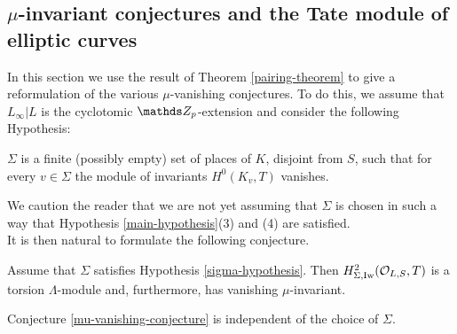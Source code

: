\documentclass[a4paper, 
headsepline=off, DIV=12, titlepage=false]{scrartcl}
\begin{document}
\subsection{$\mu$-invariant conjectures and the Tate module of elliptic curves}\label{mu-section}

In this section we use the result of Theorem \ref{pairing-theorem} to give a reformulation of the various $\mu$-vanishing conjectures. To do this, we assume that $L_\infty | L$ is the cyclotomic $\ZZ_p$-extension and consider the following Hypothesis:
\begin{hypothesis}\label{sigma-hypothesis}
    $\Sigma$ is a finite (possibly empty) set of places of $K$, disjoint from $S$, such that for every $v \in \Sigma$ the module of invariants $H^0(K_v, T)$ vanishes.
\end{hypothesis}
We caution the reader that we are not yet assuming that $\Sigma$ is chosen in such a way that Hypothesis \ref{main-hypothesis}(3) and (4) are satisfied.\\

It is then natural to formulate the following conjecture.

\begin{conjecture}\label{mu-vanishing-conjecture}
    Assume that $\Sigma$ satisfies Hypothesis \ref{sigma-hypothesis}. Then $H^2_{\Sigma, \mathrm{Iw}}(\mathcal{O}_{L,S},T)$ is a torsion $\Lambda$-module and, furthermore, has vanishing $\mu$-invariant.
\end{conjecture}

\begin{lemma}\label{mu-vanishing-independent-lemma}
    Conjecture \ref{mu-vanishing-conjecture} is independent of the choice of $\Sigma$.
\end{lemma}
\end{document}
